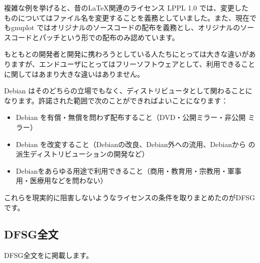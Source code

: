 \documentclass[mingoth,a4paper]{jsarticle}
\begin{document}
複雑な例を挙げると、昔の\LaTeX{}関連のライセンス LPPL 1.0 では、変更した
ものについてはファイル名を変更することを義務としていました。また、現在で
もgnuplot ではオリジナルのソースコードの配布を義務とし、オリジナルのソー
スコードとパッチという形での配布のみ認めています。

もともとの開発者と開発に携わろうとしている人たちにとっては大きな違いがあ
りますが、エンドユーザにとってはフリーソフトウェアとして、利用できること
に関してはあまり大きな違いはありません。

Debian はそのどちらの立場でもなく、ディストリビュータとして関わることに
なります。許諾された範囲で次のことができればよいことになります：

\begin{itemize}
 \item Debian を有償・無償を問わず配布すること（DVD・公開ミラー・非公開
       ミラー）
 \item Debian を改変すること（Debianの改良、Debian外への流用、Debianから
       の派生ディストリビューションの開発など）
 \item Debianをあらゆる用途で利用できること（商用・教育用・宗教用・軍事
       用・医療用などを問わない）
\end{itemize}

これらを現実的に阻害しないようなライセンスの条件を取りまとめたのがDFSGです。

\subsection{DFSG全文}

DFSG全文をに掲載します。
\end{document}
